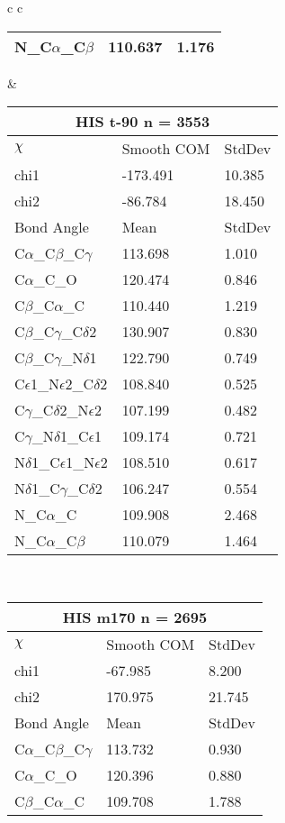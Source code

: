 \begin{longtable}{ c c }
\begin{tabular}{ l l l }
  N\_C$\alpha$\_C$\beta$ & 110.637 & 1.176\\
  \bottomrule
  \end{tabular}
  &
  \begin{tabular}{ l l l }
  \toprule
  \multicolumn{3}{c}{HIS \textbf{t-90} n = 3553} \\ \toprule
  $\chi$       & Smooth COM & StdDev \\ \midrule
  chi1 & -173.491 & 10.385 \\ 
  chi2 & -86.784 & 18.450 \\ \midrule
  Bond Angle   & Mean     & StdDev \\ \midrule
  C$\alpha$\_C$\beta$\_C$\gamma$ & 113.698 & 1.010\\
  C$\alpha$\_C\_O & 120.474 & 0.846\\
  C$\beta$\_C$\alpha$\_C & 110.440 & 1.219\\
  C$\beta$\_C$\gamma$\_C$\delta$2 & 130.907 & 0.830\\
  C$\beta$\_C$\gamma$\_N$\delta$1 & 122.790 & 0.749\\
  C$\epsilon$1\_N$\epsilon$2\_C$\delta$2 & 108.840 & 0.525\\
  C$\gamma$\_C$\delta$2\_N$\epsilon$2 & 107.199 & 0.482\\
  C$\gamma$\_N$\delta$1\_C$\epsilon$1 & 109.174 & 0.721\\
  N$\delta$1\_C$\epsilon$1\_N$\epsilon$2 & 108.510 & 0.617\\
  N$\delta$1\_C$\gamma$\_C$\delta$2 & 106.247 & 0.554\\
  N\_C$\alpha$\_C & 109.908 & 2.468\\
  N\_C$\alpha$\_C$\beta$ & 110.079 & 1.464\\
  \bottomrule
  \end{tabular}
  \\
  \begin{tabular}{ l l l }
  \toprule
  \multicolumn{3}{c}{HIS \textbf{m170} n = 2695} \\ \toprule
  $\chi$       & Smooth COM & StdDev \\ \midrule
  chi1 & -67.985 & 8.200 \\ 
  chi2 & 170.975 & 21.745 \\ \midrule
  Bond Angle   & Mean     & StdDev \\ \midrule
  C$\alpha$\_C$\beta$\_C$\gamma$ & 113.732 & 0.930\\
  C$\alpha$\_C\_O & 120.396 & 0.880\\
  C$\beta$\_C$\alpha$\_C & 109.708 & 1.788\\

\end{tabular}
\end{longtable}

